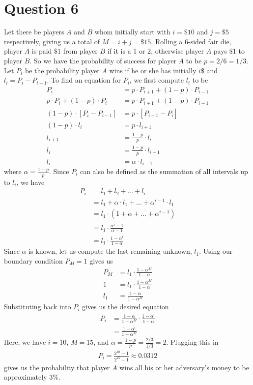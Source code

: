 \documentclass[11pt, oneside]{article}   	%
\begin{document}
\section*{Question 6}

Let there be players $A$ and $B$ whom initially start with $i=\$10$ and $j=\$5$ respectively, giving us a total of $M=i+j = \$15$. Rolling a 6-sided fair die, player $A$ is paid $\$1$ from player $B$ if it is a 1 or 2, otherwise player $A$ pays $\$1$ to player $B$. So we have the probability of success for player $A$ to be $p=2/6 = 1/3$. Let $P_i$ be the probability player $A$ wins if  he or she has initially $i\$$ and $l_i = P_i - P_{i-1}$. To find an equation for $P_i$, we first compute $l_i$ to be
\begin{align*}
	P_i & = p \cdot P_{i+1} + (1-p) \cdot P_{i-1} \\
	p \cdot P_{i} + (1-p) \cdot P_{i} & = p \cdot P_{i+1} + (1-p) \cdot P_{i-1} \\
	(1-p) \cdot [P_i - P_{i-1}] & = p \cdot [P_{i+1} - P_i] \\
	(1-p) \cdot l_i & = p \cdot l_{i+1} \\
	l_{i+1} & = \frac{1-p}{p} \cdot l_{i} \\
	l_i & = \frac{1-p}{p} \cdot l_{i-1} \\
	l_i & = \alpha \cdot l_{i-1}
\end{align*}
where $\alpha = \frac{1-p}{p}$. Since $P_i$ can also be defined as the summation of all intervals up to $l_i$, we have
\begin{align*}
	P_i & = l_1 + l_2 + \ldots + l_i \\
	& = l_1 + \alpha \cdot l_1 + \ldots + \alpha^{i-1} \cdot l_1 \\
	& = l_1 \cdot (1 + \alpha + \ldots + \alpha^{i-1}) \\
	& = l_1 \cdot \frac{\alpha^i - 1}{\alpha-1} \\
	& = l_1 \cdot \frac{1-\alpha^i}{1-\alpha}
\end{align*}
Since $\alpha$ is known, let us compute the last remaining unknown, $l_1$. Using our boundary condition $P_M =1$ gives us
\begin{align*}
	P_M & = l_1 \cdot  \frac{1-\alpha^M}{1-\alpha} \\
	1 & = l_1 \cdot  \frac{1-\alpha^M}{1-\alpha} \\
	l_1 & = \frac{1-\alpha}{1-\alpha^M}
\end{align*}
Substituting back into $P_i$ gives us the desired equation
\begin{align*}
	P_i & = \frac{1-\alpha}{1-\alpha^M} \cdot \frac{1-\alpha^i}{1-\alpha} \\
	& = \frac{1-\alpha^i}{1-\alpha^M}
\end{align*}
Here, we have $i=10$, $M=15$, and $\alpha = \frac{1-p}{p} = \frac{2/3}{1/3} = 2$. Plugging this in
\begin{align*}
	P_i = \frac{2^10-1}{2^15-1} \approx 0.0312
\end{align*}
gives us the probability that player $A$ wins all his or her adversary's money to be approximately 3\%.
\end{document}
